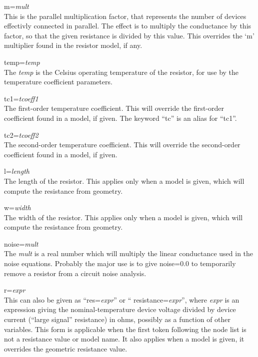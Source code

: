 \begin{description}
\item{\vt m=}{\it mult}\\
This is the parallel multiplication factor, that represents the number
of devices effectivly connected in parallel.  The effect is to
multiply the conductance by this factor, so that the given resistance
is divided by this value.  This overrides the `{\vt m}' multiplier
found in the resistor model, if any.

\item{\vt temp=}{\it temp}\\
The {\it temp} is the Celsius operating temperature of the resistor,
for use by the temperature coefficient parameters.

\item{\vt tc1=}{\it tcoeff1}\\
The first-order temperature coefficient.  This will override the
first-order coefficient found in a model, if given.  The keyword
``{\vt tc}'' is an alias for ``{\vt tc1}''.

\item{\vt tc2=}{\it tcoeff2}\\
The second-order temperature coefficient.  This will override the
second-order coefficient found in a model, if given.

\item{\vt l=}{\it length}\\
The length of the resistor.  This applies only when a model is given,
which will compute the resistance from geometry.

\item{\vt w=}{\it width}\\
The width of the resistor.  This applies only when a model is given,
which will compute the resistance from geometry.

\item{\vt noise=}{\it mult}\\
The {\it mult} is a real number which will multiply the linear
conductance used in the noise equations.  Probably the major use is to
give {\vt noise=0.0} to temporarily remove a resistor from a circuit
noise analysis.

\item{\vt r=}{\it expr}\\
This can also be given as ``{\vt res=}{\it expr\/}'' or ``{\vt
resistance=}{\it expr\/}'', where {\it expr} is an expression giving
the nominal-temperature device voltage divided by device current
(``large signal'' resistance) in ohms, possibly as a function of other
variables.  This form is applicable when the first token following the
node list is not a resistance value or model name.  It also applies
when a model is given, it overrides the geometric resistance value.


\end{description}
